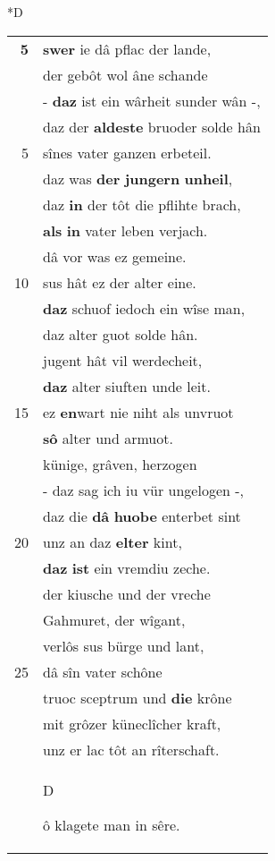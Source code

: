 \documentclass[8pt,a4paper,notitlepage]{article}
\begin{document}
\begin{table}[ht]
\begin{minipage}[t]{0.5\linewidth}
\small
\begin{center}*D
\end{center}
\begin{tabular}{rl}
\textbf{5} & \textbf{swer} ie dâ pflac der lande,\\ 
 & der gebôt wol âne schande\\ 
 & - \textbf{daz} ist ein wârheit sunder wân -,\\ 
 & daz der \textbf{aldeste} bruoder solde hân\\ 
5 & sînes vater ganzen erbeteil.\\ 
 & daz was \textbf{der} \textbf{jungern} \textbf{unheil},\\ 
 & daz \textbf{in} der tôt die pflihte brach,\\ 
 & \textbf{als} \textbf{in} vater leben verjach.\\ 
 & dâ vor was ez gemeine.\\ 
10 & sus hât ez der alter eine.\\ 
 & \textbf{daz} schuof iedoch ein wîse man,\\ 
 & daz alter guot solde hân.\\ 
 & jugent hât vil werdecheit,\\ 
 & \textbf{daz} alter siuften unde leit.\\ 
15 & ez \textbf{en}wart nie niht als unvruot\\ 
 & \textbf{sô} alter und armuot.\\ 
 & künige, grâven, herzogen\\ 
 & - daz sag ich iu vür ungelogen -,\\ 
 & daz die \textbf{dâ} \textbf{huobe} enterbet sint\\ 
20 & unz an daz \textbf{elter} kint,\\ 
 & \textbf{daz} \textbf{ist} ein vremdiu zeche.\\ 
 & der kiusche und der vreche\\ 
 & Gahmuret, der wîgant,\\ 
 & verlôs sus bürge und lant,\\ 
25 & dâ sîn vater schône\\ 
 & truoc sceptrum und \textbf{die} krône\\ 
 & mit grôzer küneclîcher kraft,\\ 
 & unz er lac tôt an rîterschaft.\\ 
 & \begin{large}D\end{large}ô klagete man in sêre.\\ 

\end{tabular}
\end{minipage}
\end{table}
\end{document}

